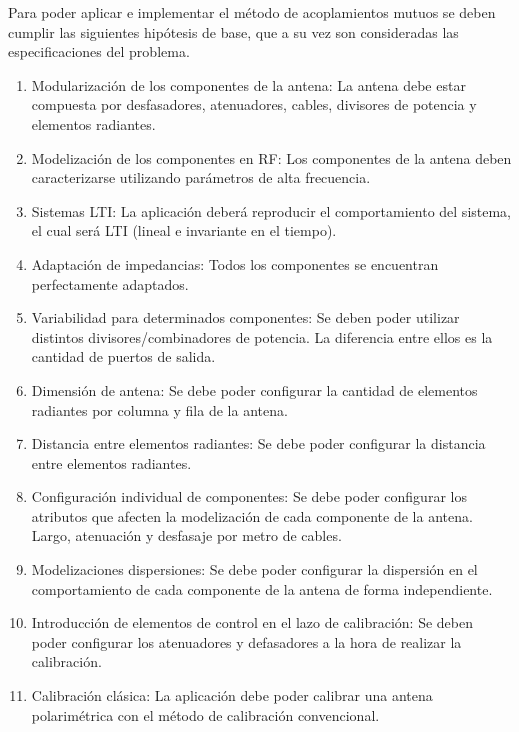 Para poder aplicar e implementar el método de acoplamientos mutuos se deben cumplir las siguientes hipótesis de base, que a su
vez son consideradas las especificaciones del problema.

\begin{enumerate}
    \item Modularización de los componentes de la antena: La antena debe estar compuesta por desfasadores, atenuadores, cables,
		divisores de potencia y elementos radiantes.

	\item Modelización de los componentes en RF: Los componentes de la antena deben caracterizarse utilizando parámetros de alta
		frecuencia.

    \item Sistemas LTI: La aplicación deberá reproducir el comportamiento del sistema, el cual será LTI (lineal e invariante
		en el tiempo).

	\item Adaptación de impedancias: Todos los componentes se encuentran perfectamente adaptados.

    \item Variabilidad para determinados componentes: Se deben poder utilizar distintos divisores/combinadores de potencia.
		La diferencia entre ellos es la cantidad de puertos de salida.

    \item Dimensión de antena: Se debe poder configurar la cantidad de elementos radiantes por columna y fila de la antena.
    \item Distancia entre elementos radiantes: Se debe poder configurar la distancia entre elementos radiantes.
    \item Configuración individual de componentes: Se debe poder configurar los atributos que afecten la modelización de cada
		componente de la antena. Largo, atenuación y desfasaje por metro de cables.

    \item Modelizaciones dispersiones: Se debe poder configurar la dispersión en el comportamiento de cada componente de la
		antena de forma independiente.

    \item Introducción de elementos de control en el lazo de calibración: Se deben poder configurar los atenuadores y
		defasadores a la hora de realizar la calibración.

    \item Calibración clásica: La aplicación debe poder calibrar una antena polarimétrica con el método de calibración convencional.


\end{enumerate}
